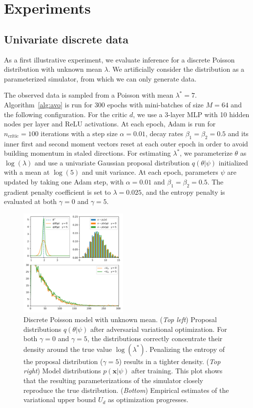 \documentclass[twocolumn,superscriptaddress,aps]{revtex4-1}
\theoremstyle{plain}
\begin{document}
\section{Experiments}

\subsection{Univariate discrete data}

As a first illustrative experiment, we evaluate inference for a discrete Poisson
distribution with unknown mean $\lambda$. We artificially consider
the distribution as a parameterized simulator, from which we can only
generate data.

The observed data is sampled from a Poisson with mean $\lambda^* = 7$.
Algorithm~\ref{alg:avo} is run for 300 epochs with mini-batches of size $M=64$
and the following configuration. For the critic $d$, we use a 3-layer MLP with 10
hidden nodes per layer and ReLU activations. At each epoch, Adam is run for
$n_\text{critic}=100$ iterations with a step size $\alpha=0.01$, decay rates
$\beta_1=\beta_2=0.5$ and its inner first and second moment vectors reset at
each outer epoch in order to avoid building momentum in staled directions.  For
estimating $\lambda^*$, we parameterize $\theta$ as $\log(\lambda)$ and use a univariate Gaussian proposal distribution
$q(\theta|\psi)$ initialized with a mean at $\log(5)$ and unit variance. At
each epoch, parameters $\psi$ are updated by taking one Adam step, with
$\alpha=0.01$ and $\beta_1=\beta_2=0.5$. The gradient penalty coefficient is set to
$\lambda=0.025$, and the entropy penalty is evaluated at both $\gamma=0$ and $\gamma=5$.

\begin{figure}
    \centering
    \includegraphics[width=0.48\textwidth]{figures/poisson.pdf}
    \caption{Discrete Poisson model with unknown mean.
             ({\it Top left}) Proposal distributions $q(\theta|\psi)$ after adversarial variational optimization. For both $\gamma=0$ and $\gamma=5$, the distributions correctly concentrate their density around
                        the true value $\log(\lambda^*)$. Penalizing the entropy of the proposal distribution ($\gamma=5$) results in a tighter density.
             ({\it Top right}) Model distributions $p(\mathbf{x}|\psi)$ after training. This plot shows that the resulting parameterizations of the simulator closely reproduce the true distribution.
             ({\it Bottom}) Empirical estimates of the variational upper bound $U_d$ as optimization progresses.
             }\label{fig:poisson}
\end{figure}
\end{document}
